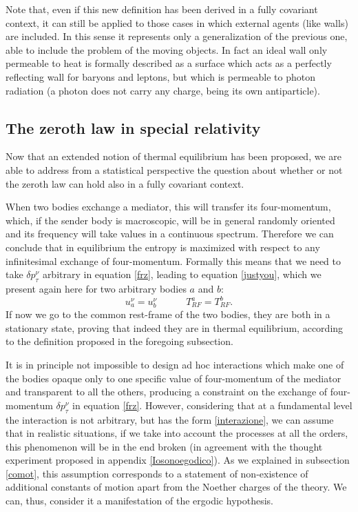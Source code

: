 \documentclass[twocolumn,usenatbib]{mnras2}
\newcommand{\spc}{\quad \quad \quad}
\begin{document}
Note that, even if this new definition has been derived in a fully covariant context, it can still be applied to those cases in which external agents (like walls) are included. In this sense it represents only a generalization of the previous one, able to include the problem of the moving objects. In fact an ideal wall only permeable to heat is formally described as a surface which acts as a perfectly reflecting wall for baryons and leptons, but which is permeable to photon radiation (a photon does not carry any charge, being its own antiparticle).

\subsection{The zeroth law in special relativity}

Now that an extended notion of thermal equilibrium has been proposed, we are able to address from a statistical perspective the question about whether or not the zeroth law can hold also in a fully covariant context.

When two bodies exchange a mediator, this will transfer its four-momentum, which, if the sender body is macroscopic, will be in general randomly oriented and its frequency will take values in a continuous spectrum. Therefore we can conclude that in equilibrium the entropy is maximized with respect to any infinitesimal exchange of four-momentum. Formally this means that we need to take $\delta p_\tau^\nu$ arbitrary in equation \eqref{frz}, leading to equation \eqref{justyou}, which we present again here for two arbitrary bodies $a$ and $b$:
\begin{equation}
u^\nu_a = u^\nu_b \spc  T_{RF}^a = T_{RF}^b .
\end{equation}
If now we go to the common rest-frame of the two bodies, they are both in a stationary state, proving that indeed they are in thermal equilibrium, according to the definition proposed in the foregoing subsection. 

It is in principle not impossible to design ad hoc interactions which make one of the bodies opaque only to one specific value of four-momentum of the mediator and transparent to all the others, producing a constraint on the exchange of four-momentum $\delta p_\tau^\nu$ in equation \eqref{frz}. However, considering that at a fundamental level the interaction is not arbitrary, but has the form \eqref{interazione}, we can assume that in realistic situations, if we take into account the processes at all the orders, this phenomenon will be in the end broken  (in agreement with the thought experiment proposed in appendix \ref{Iosonoegodico}). As we explained in subsection \ref{comot}, this assumption corresponds to a statement of non-existence of additional constants of motion apart from the Noether charges of the theory. We can, thus, consider it a manifestation of the ergodic hypothesis.
\end{document}
